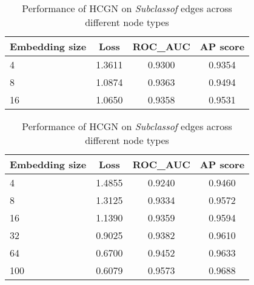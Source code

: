 \begin{table}[h]
    \vspace{1em}
    
    \begin{subtable}[t]{\textwidth}
        \centering
        \begin{tabular}{lccc}        
            \toprule
            \textbf{Embedding size} & \textbf{Loss} & \textbf{ROC\_AUC} & \textbf{AP score} \\
            \midrule
            4 & 1.3611 & 0.9300 & 0.9354 \\
            8 & 1.0874 & 0.9363 & 0.9494 \\
            16 & 1.0650 & 0.9358 & 0.9531 \\
            \bottomrule
        \end{tabular}
        \caption{Node type \textit{GO} - Connected component $G1$}
    \end{subtable}
    
    \vspace{1em}
    
    \begin{subtable}[t]{\textwidth}
        \centering
        \begin{tabular}{lccc}        
            \toprule
            \textbf{Embedding size} & \textbf{Loss} & \textbf{ROC\_AUC} & \textbf{AP score} \\
            \midrule
            4 & 1.4855 & 0.9240 & 0.9460 \\
            8 & 1.3125 & 0.9334 & 0.9572 \\
            16 & 1.1390 & 0.9359 & 0.9594 \\
            32 & 0.9025 & 0.9382 & 0.9610 \\
            64 & 0.6700 & 0.9452 & 0.9633 \\
            100 & 0.6079 & 0.9573 & 0.9688 \\
            \bottomrule
        \end{tabular}
        \caption{Node type \textit{Phenotype}}
    \end{subtable}
    
    \caption{Performance of HCGN on \textit{Subclassof} edges across different node types}
\end{table}
